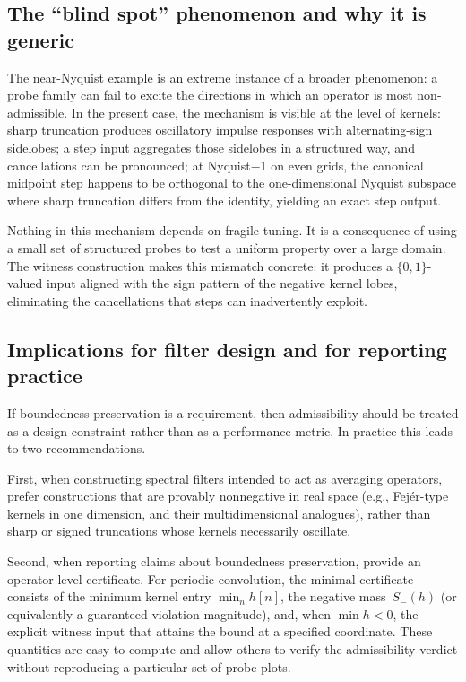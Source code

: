 \documentclass[11pt,a4paper]{article}
\theoremstyle{plain}
\theoremstyle{definition}
\theoremstyle{plain}
\newcommand{\Sminus}{S_{-}}
\begin{document}
\subsection{The ``blind spot'' phenomenon and why it is generic}

The near-Nyquist example is an extreme instance of a broader phenomenon: a probe
family can fail to excite the directions in which an operator is most
non-admissible.  In the present case, the mechanism is visible at the level of
kernels: sharp truncation produces oscillatory impulse responses with
alternating-sign sidelobes; a step input aggregates those sidelobes in a
structured way, and cancellations can be pronounced; at Nyquist$-$1 on even
grids, the canonical midpoint step happens to be orthogonal to the
one-dimensional Nyquist subspace where sharp truncation differs from the
identity, yielding an exact step output.

Nothing in this mechanism depends on fragile tuning.  It is a consequence of
using a small set of structured probes to test a uniform property over a large
domain.  The witness construction makes this mismatch concrete: it produces a
$\{0,1\}$-valued input aligned with the sign pattern of the negative kernel
lobes, eliminating the cancellations that steps can inadvertently exploit.


\subsection{Implications for filter design and for reporting practice}

If boundedness preservation is a requirement, then admissibility should be
treated as a design constraint rather than as a performance metric.  In practice
this leads to two recommendations.

First, when constructing spectral filters intended to act as averaging operators,
prefer constructions that are provably nonnegative in real space (e.g.,
Fej\'er-type kernels in one dimension, and their multidimensional analogues),
rather than sharp or signed truncations whose kernels necessarily oscillate.

Second, when reporting claims about boundedness preservation, provide an
operator-level certificate.  For periodic convolution, the minimal certificate
consists of the minimum kernel entry $\min_n h[n]$, the negative
mass~$\Sminus(h)$ (or equivalently a guaranteed violation magnitude), and, when
$\min h < 0$, the explicit witness input that attains the bound at a specified
coordinate.  These quantities are easy to compute and allow others to verify the
admissibility verdict without reproducing a particular set of probe plots.
\end{document}
